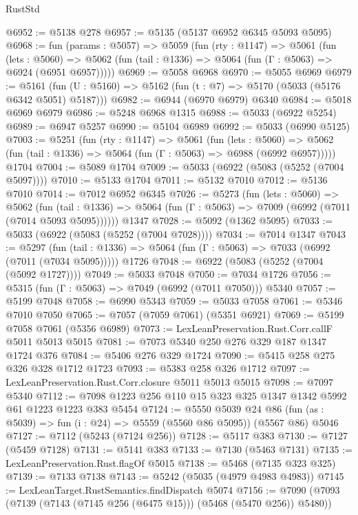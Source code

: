 \begin{lexlean}{RustStd}
\begin{coremodule}
@6952 := @5138 @278
@6957 := @5135 (@5137 @6952 @6345 @5093 @5095)
@6968 := fun (params : @5057) =>
  @5059
    (fun (rty : @1147) =>
    @5061
      (fun (lets : @5060) =>
      @5062 (fun (tail : @1336) => @5064 (fun (Γ : @5063) => @6924 (@6951 @6957)))))
@6969 := @5058 @6968
@6970 := @5055 @6969
@6979 := @5161 (fun (U : @5160) => @5162 (fun (t : @7) => @5170 (@5033 (@5176 @6342 @5051) @5187)))
@6982 := @6944 (@6970 @6979) @6340
@6984 := @5018 @6969 @6979
@6986 := @5248 @6968 @1315
@6988 := @5033 (@6922 @5254)
@6989 := @6947 @5257
@6990 := @5104 @6989
@6992 := @5033 (@6990 @5125)
@7003 := @5251
    (fun (rty : @1147) =>
    @5061
      (fun (lets : @5060) =>
      @5062 (fun (tail : @1336) => @5064 (fun (Γ : @5063) => @6988 (@6992 @6957)))))
    @1704
@7004 := @5089 @1704
@7009 := @5033 (@6922 (@5083 (@5252 (@7004 @5097))))
@7010 := @5133 @1704
@7011 := @5132 @7010
@7012 := @5136 @7010
@7014 := @7012 @6952 @6345
@7026 := @5273
    (fun (lets : @5060) =>
    @5062
      (fun (tail : @1336) => @5064 (fun (Γ : @5063) => @7009 (@6992 (@7011 (@7014 @5093 @5095))))))
    @1347
@7028 := @5092 (@1362 @5095)
@7033 := @5033 (@6922 (@5083 (@5252 (@7004 @7028))))
@7034 := @7014 @1347
@7043 := @5297
    (fun (tail : @1336) => @5064 (fun (Γ : @5063) => @7033 (@6992 (@7011 (@7034 @5095)))))
    @1726
@7048 := @6922 (@5083 (@5252 (@7004 (@5092 @1727))))
@7049 := @5033 @7048
@7050 := @7034 @1726
@7056 := @5315 (fun (Γ : @5063) => @7049 (@6992 (@7011 @7050))) @5340
@7057 := @5199 @7048
@7058 := @6990 @5343
@7059 := @5033 @7058
@7061 := @5346 @7010 @7050
@7065 := @7057 (@7059 @7061) (@5351 @6921)
@7069 := @5199 @7058 @7061 (@5356 @6989)
@7073 := LexLeanPreservation.Rust.Corr.callF @5011 @5013 @5015
@7081 := @7073 @5340 @250 @276 @329 @187 @1347 @1724 @376
@7084 := @5406 @276 @329 @1724
@7090 := @5415 @258 @275 @326 @328 @1712 @1723
@7093 := @5383 @258 @326 @1712
@7097 := LexLeanPreservation.Rust.Corr.closure @5011 @5013 @5015
@7098 := @7097 @5340
@7112 := @7098 @1223 @256 @110 @15 @323 @325 @1347 @1342 @5992 @61 @1223 @1223 @383 @5454
@7124 := @5550
    @5039
    @24
    @86
    (fun (as : @5039) => fun (i : @24) => @5559 (@5560 @86 @5095))
    (@5567 @86)
    @5046
@7127 := @7112 (@5243 (@7124 @256))
@7128 := @5117 @383
@7130 := @7127 (@5459 @7128)
@7131 := @5141 @383
@7133 := @7130 (@5463 @7131)
@7135 := LexLeanPreservation.Rust.flagOf @5015
@7138 := @5468 (@7135 @323 @325)
@7139 := @7133 @7138
@7143 := @5242 (@5035 (@4979 @4983 @4983))
@7145 := LexLeanTarget.RustSemantics.findDispatch @5074
@7156 := @7090 (@7093 (@7139 (@7143 (@7145 @256 (@6475 @15))) (@5468 (@5470 @256)) @5480))

\end{coremodule}
\end{lexlean}
